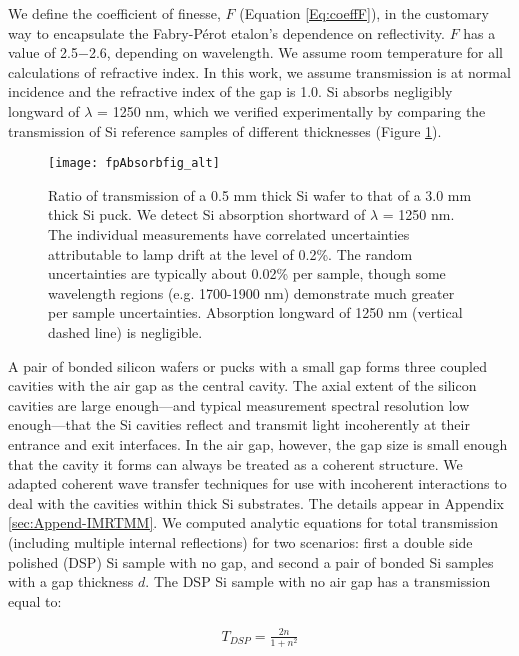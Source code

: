 \documentclass[osajnl,twocolumn,showpacs,superscriptaddress,11pt]{revtex4-1} %
\begin{document}
We define the coefficient of finesse\cite{2007fuph.book.....S}, $F$ (Equation \ref{Eq:coeffF}), in the customary way to encapsulate the Fabry-P\'{e}rot etalon's dependence on reflectivity.  $F$ has a value of 2.5$-$2.6, depending on wavelength.  We assume room temperature for all calculations of refractive index.  In this work, we assume transmission is at normal incidence and the refractive index of the gap is 1.0.  Si absorbs negligibly longward of $\lambda$ = 1250 nm, which we verified experimentally by comparing the transmission of Si reference samples of different thicknesses (Figure \ref{figSiAbsorbfig}).

\begin{figure}[htbp]
\texttt{[image: fpAbsorbfig\_alt]}
\caption{Ratio of transmission of a 0.5 mm thick Si wafer to that of a 3.0 mm thick Si puck.  \label{figSiAbsorbfig} We detect Si absorption shortward of $\lambda$ = 1250 nm.  The individual measurements have correlated uncertainties attributable to lamp drift at the level of 0.2\%.  The random uncertainties are typically about 0.02\% per sample, though some wavelength regions (e.g. 1700-1900 nm) demonstrate much greater per sample uncertainties.  Absorption longward of 1250 nm (vertical dashed line) is negligible.}
\end{figure}

A pair of bonded silicon wafers or pucks with a small gap forms three coupled cavities with the air gap as the central cavity.  The axial extent of the silicon cavities are large enough---and typical measurement spectral resolution low enough---that the Si cavities reflect and transmit light incoherently at their entrance and exit interfaces.  In the air gap, however, the gap size is small enough that the cavity it forms can always be treated as a coherent structure.  We adapted coherent wave transfer techniques \cite{2007fuph.book.....S} for use with incoherent interactions \cite{2002ApOpt..41.3978K} to deal with the cavities within thick Si substrates.  The details appear in Appendix \ref{sec:Append-IMRTMM}.  We computed analytic equations for total transmission (including multiple internal reflections) for two scenarios: first a double side polished (DSP) Si sample with no gap, and second a pair of bonded Si samples with a gap thickness $d$.  The DSP Si sample with no air gap has a transmission equal to:

\begin{eqnarray}
T_{DSP} = \frac{2n}{1+n^2} \label{eqnAbsDSPtrans}
\end{eqnarray}
\end{document}
